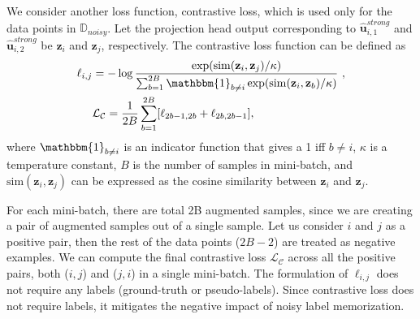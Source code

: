 \documentclass[10pt,twocolumn,letterpaper]{article}
\begin{document}
We consider another loss function, contrastive loss, which is used only for the data points in $\mathbb{D}_{noisy}$. 
Let the projection head output corresponding to  $\hat{\mathbf{u}}^{strong}_{i,1}$ and $\hat{\mathbf{u}}^{strong}_{i,2}$ be $\mathbf{z}_{i}$ and $\mathbf{z}_{j}$, respectively. The contrastive loss function \cite{chen2020simple,khosla2020supervised} can be defined as
\begin{align}
        \ell_{i,j}  & = -\log \frac{\exp(\mathrm{sim}( \mathbf{z}_{i}, \mathbf{z}_{j})/\kappa)}{\sum_{b=1}^{2B} \mathbbm{1}_{b \neq i}\exp(\mathrm{sim}(\mathbf{z}_i, \mathbf{z}_b)/\kappa)}~, \\
        & \mathcal{L}_\mathcal{C}= \frac{1}{2B}\sum_{b=1}^{2B}[\ell_{2b-1,2b} + \ell_{2b,2b-1}] \label{eq:con_loss},
\end{align}
where $\mathbbm{1}_{b \neq i}$ is an indicator function that gives a 1 iff $b \neq i$, $\kappa$ is a temperature constant, $B$ is the number of samples in mini-batch, and $\mathrm{sim}(\mathbf{z}_{i}, \mathbf{z}_{j})$ can be expressed as the cosine similarity between $\mathbf{z}_{i}$ and $\mathbf{z}_{j}$. 

For each mini-batch, there are total 2B augmented samples, since we are creating a pair of augmented samples out of a single sample.  Let us consider $i$ and $j$ as a positive pair, then the rest of the data points ($2B-2$) are treated as negative examples. We can compute the final contrastive loss $\mathcal{L}_\mathcal{C}$ across all the positive pairs, both ($i,j$) and ($j,i$) in a single mini-batch. The formulation of $ \ell_{i,j} $ does not require any labels (ground-truth or pseudo-labels). Since contrastive loss does not require labels, it mitigates the negative impact of noisy label memorization. 
\end{document}
